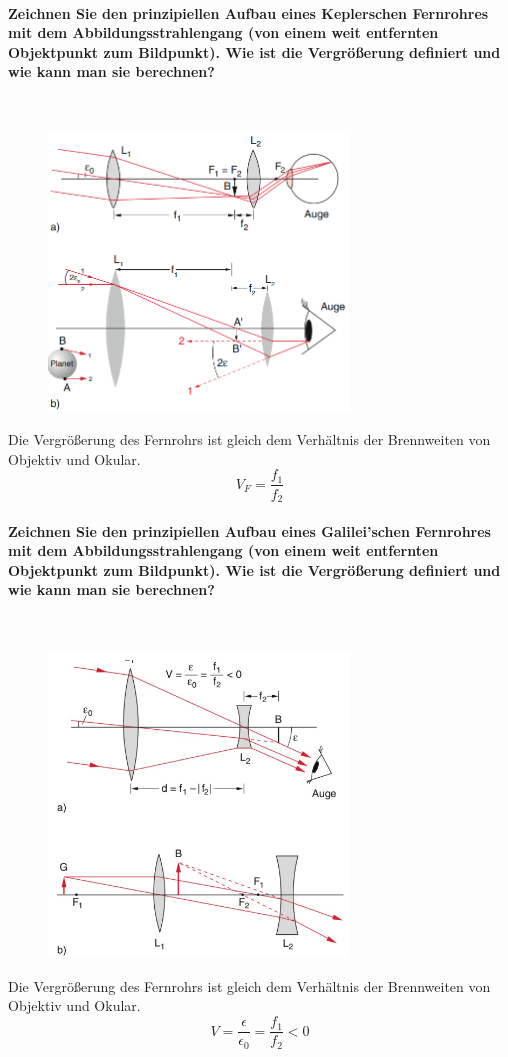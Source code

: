 \documentclass[a4paper, 11pt, ngerman, parskip=half-]{scrartcl}
\begin{document}
    \paragraph{Zeichnen Sie den prinzipiellen Aufbau eines Keplerschen Fernrohres mit dem
        Abbildungsstrahlengang (von einem weit entfernten Objektpunkt zum Bildpunkt). Wie ist die
        Vergrößerung definiert und wie kann man sie berechnen?} ~
    \begin{figure}[H]
        \centering
        \includegraphics[width=8cm]{image/20/7.png}
    \end{figure}
    Die Vergrößerung des Fernrohrs ist gleich dem Verhältnis der Brennweiten von Objektiv und Okular.
    \begin{equation}
        V_F = \frac{f_1}{f_2}
    \end{equation}

    \paragraph{Zeichnen Sie den prinzipiellen Aufbau eines Galilei'schen Fernrohres mit dem
        Abbildungsstrahlengang (von einem weit entfernten Objektpunkt zum Bildpunkt). Wie ist die
        Vergrößerung definiert und wie kann man sie berechnen?} ~

    \begin{figure}[H]
        \centering
        \includegraphics[width=8cm]{image/20/8.png}
    \end{figure}
    Die Vergrößerung des Fernrohrs ist gleich dem Verhältnis der Brennweiten von Objektiv und Okular.
    \begin{equation}
        V = \frac{\epsilon}{\epsilon_0} = \frac{f_1}{f_2} < 0
    \end{equation}
\end{document}
